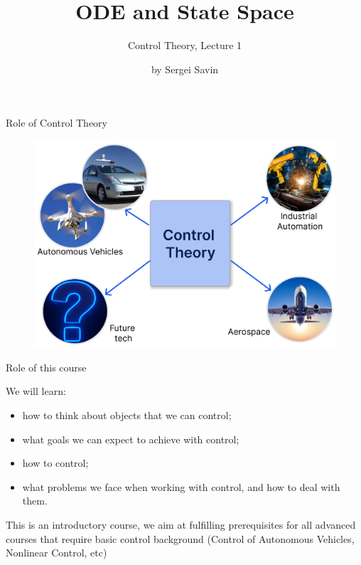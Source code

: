 \documentclass{beamer}
\title{ODE and State Space}
\subtitle{Control Theory, Lecture 1}
\author{by Sergei Savin}
\date{\mydate}
\begin{document}
\maketitle





\begin{frame}{Role of Control Theory}
	\begin{flushleft}
		
		\begin{figure}
			\centering
			\includegraphics[width=1.00\linewidth]{"Control Examples"}

			\label{fig:control-examples}
		\end{figure}
		
		
	\end{flushleft}
\end{frame}


\begin{frame}{Role of this course}
	\begin{flushleft}
		
		We will learn:
		
		\begin{itemize}
			\item how to think about objects that we can control;
			
			\item what goals we can expect to achieve with control;
			
			\item how to control;
			
			\item what problems we face when working with control, and how to deal with them.
		\end{itemize}
		
		\bigskip
		
		This is an introductory course, we aim at fulfilling prerequisites for all advanced courses that require basic control background (Control of Autonomous Vehicles, Nonlinear Control, etc)
		
	\end{flushleft}
\end{frame}
\end{document}
